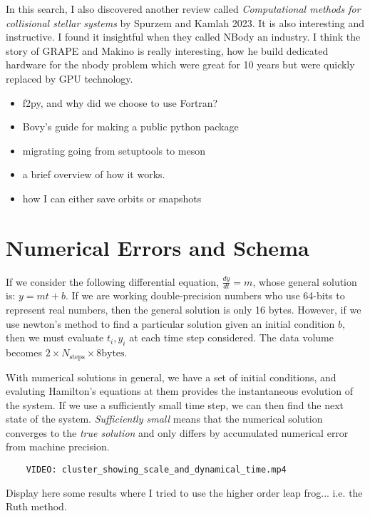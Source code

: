     In this search, I also discovered another review called \textit{Computational methods for collisional stellar systems} by Spurzem and Kamlah 2023. It is also interesting and instructive. I found it insightful when they called NBody an industry. I think the story of GRAPE and Makino is really interesting, how he build dedicated hardware for the nbody problem which were great for 10 years but were quickly replaced by GPU technology. 
    \begin{itemize}
        \item f2py, and why did we choose to use Fortran? 
        \item Bovy's guide for making a public python package
        \item migrating going from setuptools to meson
        \item a brief overview of how it works. 
        \item how I can either save orbits or snapshots
    \end{itemize}



\section{Numerical Errors and Schema} 

    If we consider the following differential equation, $\frac{dy}{dt}=m$, whose general solution is: $y=mt+b$. If we are working double-precision numbers who use 64-bits to represent real numbers, then the general solution is only 16 bytes. However, if we use newton's method to find a particular solution given an initial condition $b$, then we must evaluate $t_i,y_i$ at each time step considered. The data volume becomes $2\times N_\mathrm{steps}\times 8 \mathrm{bytes}$. 

    With numerical solutions in general, we have a set of initial conditions, and evaluting Hamilton's equations at them provides the instantaneous evolution of the system. If we use a sufficiently small time step, we can then find the next state of the system. \textit{Sufficiently small} means that the numerical solution converges to the \textit{true solution} and only differs by accumulated numerical error from machine precision. 

    \begin{verbatim}
    VIDEO: cluster_showing_scale_and_dynamical_time.mp4
    \end{verbatim}
    Display here some results where I tried to use the higher order leap frog... i.e. the Ruth method. 

